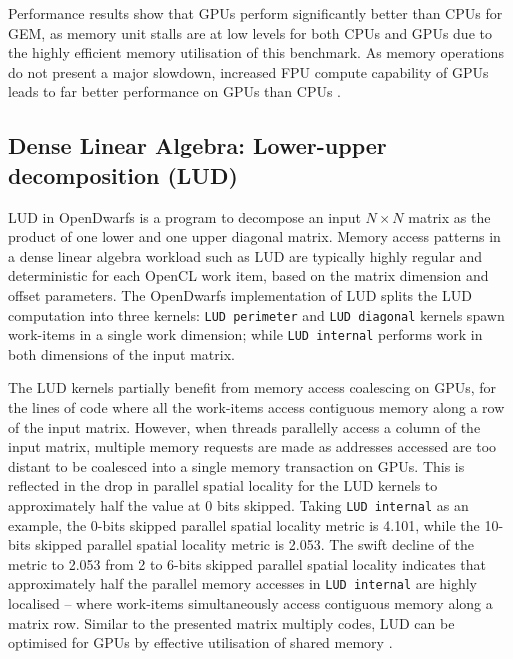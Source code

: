 \documentclass[review=false, sigchi]{acmart}
\begin{document}
	Performance results \cite{dwarfsonaccelerators, krommydas2016opendwarfs} show that GPUs perform significantly better than CPUs for GEM, as memory unit stalls are at low levels for both CPUs and GPUs due to the highly efficient memory utilisation of this benchmark. 
	As memory operations do not present a major slowdown, increased FPU compute capability of GPUs leads to far better performance on GPUs than CPUs \cite{krommydas2016opendwarfs}. 
	
	\subsection{Dense Linear Algebra: Lower-upper decomposition (LUD)}
	
	LUD in OpenDwarfs is a program to decompose an input $N\times N$ matrix as the product of one lower and one upper diagonal matrix. 
	Memory access patterns in a dense linear algebra workload such as LUD are typically highly regular and deterministic for each OpenCL work item, based on the matrix dimension and offset parameters. The OpenDwarfs implementation of LUD \cite{opendwarfs2020head} splits the LUD computation into three kernels: \texttt{LUD perimeter} and \texttt{LUD diagonal} kernels spawn work-items in a single work dimension; while \texttt{LUD internal} performs work in both dimensions of the input matrix.
	
	The LUD kernels partially benefit from memory access coalescing on GPUs, for the lines of code where all the work-items access contiguous memory along a row of the input matrix. 
	However, when threads parallelly access a column of the input matrix, multiple memory requests are made as addresses accessed are too distant to be coalesced into a single memory transaction on GPUs. 
	This is reflected in the drop in parallel spatial locality for the LUD kernels to approximately half the value at 0 bits skipped. Taking \texttt{LUD internal} as an example, the 0-bits skipped parallel spatial locality metric is 4.101, while the 10-bits skipped parallel spatial locality metric is 2.053. 
	The swift decline of the metric to 2.053 from 2 to 6-bits skipped parallel spatial locality indicates that approximately half the parallel memory accesses in \texttt{LUD internal} are highly localised -- where work-items simultaneously access contiguous memory along a matrix row. 
	Similar to the presented matrix multiply codes, LUD can be optimised for GPUs by effective utilisation of shared memory \cite{opendwarfs2020head}.
	
	
\end{document}
